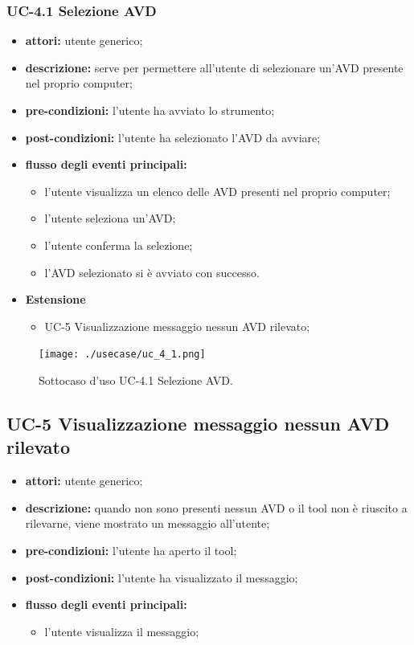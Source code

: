 \subsubsection*{UC-4.1 Selezione AVD}\label{subsubsec:uc-4.1-selezione-avd}
\begin{itemize}
    \item \textbf{attori:} utente generico;
    \item \textbf{descrizione:} serve per permettere all'utente di selezionare un'AVD presente nel proprio computer;
    \item \textbf{pre-condizioni:} l'utente ha avviato lo strumento;
    \item \textbf{post-condizioni:} l'utente ha selezionato l'AVD da avviare;
    \item \textbf{flusso degli eventi principali:}
    \begin{itemize}
        \item l'utente visualizza un elenco delle AVD presenti nel proprio computer;
        \item l'utente seleziona un'AVD;
        \item l'utente conferma la selezione;
        \item l'AVD selezionato si è avviato con successo.
    \end{itemize}
    \item \textbf{Estensione}
    \begin{itemize}
        \item UC-5 Visualizzazione messaggio nessun AVD rilevato;
    \end{itemize}
\end{itemize}
\begin{figure}
    \centering
    \texttt{[image: ./usecase/uc\_4\_1.png]}
    \caption{Sottocaso d'uso UC-4.1 Selezione AVD.}
\end{figure}

\subsection*{UC-5 Visualizzazione messaggio nessun AVD rilevato} \label{subsec:uc-5-visualizzazione-messaggio-nessun-avd-rilevato}
\begin{itemize}
    \item \textbf{attori:} utente generico;
    \item \textbf{descrizione:} quando non sono presenti nessun AVD o il tool non è riuscito a rilevarne, viene mostrato un messaggio all'utente;
    \item \textbf{pre-condizioni:} l'utente ha aperto il tool;
    \item \textbf{post-condizioni:} l'utente ha visualizzato il messaggio;
    \item \textbf{flusso degli eventi principali:}
    \begin{itemize}
        \item l'utente visualizza il messaggio;
    \end{itemize}
\end{itemize}
